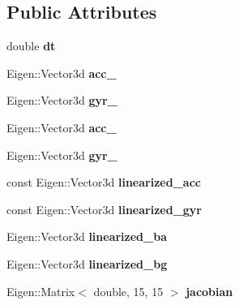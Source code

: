 \subsection*{Public Attributes}
\begin{DoxyCompactItemize}
\item 
\mbox{\label{classIntegrationBase_a705255b7e649f626550f152fef777480}} 
double {\bfseries dt}
\item 
\mbox{\label{classIntegrationBase_a735e7b2e81b96a2358cb777055b39484}} 
Eigen\+::\+Vector3d {\bfseries acc\+\_}
\item 
\mbox{\label{classIntegrationBase_ad4db133c1c376d857b11425fa2aab4f2}} 
Eigen\+::\+Vector3d {\bfseries gyr\+\_}
\item 
\mbox{\label{classIntegrationBase_a0344f0a9b5542322c00591da0d532f36}} 
Eigen\+::\+Vector3d {\bfseries acc\+\_}
\item 
\mbox{\label{classIntegrationBase_a7f724ac3c12b898af409a5c6c9a693be}} 
Eigen\+::\+Vector3d {\bfseries gyr\+\_}
\item 
\mbox{\label{classIntegrationBase_a4c508e358e96a2b68c76b10e420e8dba}} 
const Eigen\+::\+Vector3d {\bfseries linearized\+\_\+acc}
\item 
\mbox{\label{classIntegrationBase_abf39f037f7da4c59cdde350a1d49949a}} 
const Eigen\+::\+Vector3d {\bfseries linearized\+\_\+gyr}
\item 
\mbox{\label{classIntegrationBase_abd22ce8246e736e9acee1a6a8cb6a440}} 
Eigen\+::\+Vector3d {\bfseries linearized\+\_\+ba}
\item 
\mbox{\label{classIntegrationBase_a0a3d687eaed9f9e6027fe86d26b5ed24}} 
Eigen\+::\+Vector3d {\bfseries linearized\+\_\+bg}
\item 
\mbox{\label{classIntegrationBase_af5e1a822a273149873ea6fae9ca0c904}} 
Eigen\+::\+Matrix$<$ double, 15, 15 $>$ {\bfseries jacobian}
\item 

\end{DoxyCompactItemize}
